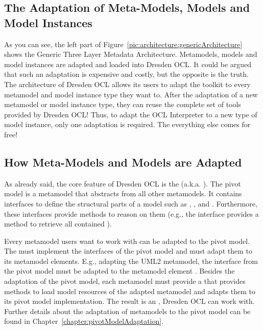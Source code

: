 \subsection{The Adaptation of Meta-Models, Models and Model Instances}

As you can see, the left part of 
Figure~\ref{pic:architecture:genericArchitecture} shows the Generic Three Layer
Metadata Architecture. Metamodels, models and model instances are adapted and 
loaded into Dresden OCL. It could be argued that such an adaptation is expensive
and costly, but the opposite is the truth. The architecture of Dresden OCL allows
its users to adapt the toolkit to every metamodel and model instance type they 
want to. After the adaptation of a new metamodel or model instance type, they
can reuse the complete set of tools provided by Dresden OCL! Thus,
to adapt the OCL Interpreter to a new type of model instance, only one 
adaptation is required. The everything else comes for free!


\subsection{How Meta-Models and Models are Adapted}
\label{architecture:metaModelAdaptation}

As already said, the core feature of Dresden OCL is the 
(a.k.a. ). The pivot model is a metamodel that abstracts
from all other metamodels. It contains interfaces to define the structural 
parts of a model such as , ,  and
. Furthermore, these interfaces provide methods to reason on
them (e.g., the interface  provides a method
 to retrieve all contained ).

Every metamodel users want to work with can be adapted to the pivot model. The
 must implement the interfaces of the pivot model 
and must adapt them to its metamodel elements. E.g., adapting the UML2 
metamodel, the interface  from the pivot model must be adapted to 
the metamodel element . Besides the adaptation of the pivot 
model, each metamodel must provide a  that provides 
methods to load model resources of the adapted metamodel and adapts them to 
its pivot model implementation. The result is an ,
Dresden OCL can work with. Further details about the adaptation of metamodels to
the pivot model can be found in Chapter~\ref{chapter:pivotModelAdaptation}.


